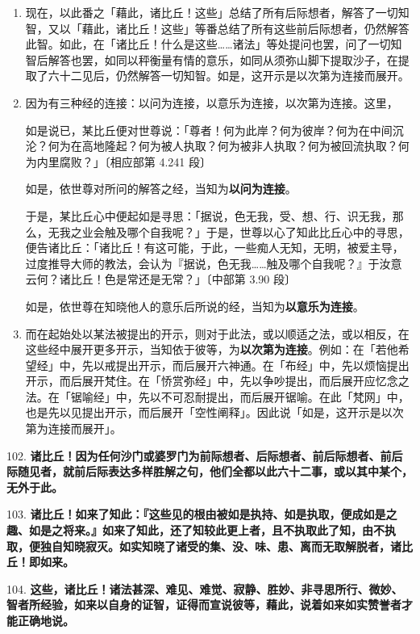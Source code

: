 \begin{enumerate}\item 现在，以此番之「藉此，诸比丘！这些」总结了所有后际想者，解答了一切知智，又以「藉此，诸比丘！这些」等番总结了所有这些前后际想者，仍然解答此智。如此，在「诸比丘！什么是这些……诸法」等处提问也罢，问了一切知智后解答也罢，如同以秤衡量有情的意乐，如同从须弥山脚下提取沙子，在提取了六十二见后，仍然解答一切知智。如是，这开示是以次第为连接而展开。
\item 因为有三种经的连接：以问为连接，以意乐为连接，以次第为连接。这里，\begin{quoting}如是说已，某比丘便对世尊说：「尊者！何为此岸？何为彼岸？何为在中间沉沦？何为在高地隆起？何为被人执取？何为被非人执取？何为被回流执取？何为内里腐败？」{\bluefootnotesize 〔相应部第 4.241 段〕}\end{quoting}如是，依世尊对所问的解答之经，当知为\textbf{以问为连接}。\begin{quoting}于是，某比丘心中便起如是寻思：「据说，色无我，受、想、行、识无我，那么，无我之业会触及哪个自我呢？」于是，世尊以心了知此比丘心中的寻思，便告诸比丘：「诸比丘！有这可能，于此，一些痴人无知，无明，被爱主导，过度推导大师的教法，会认为『据说，色无我……触及哪个自我呢？』于汝意云何？诸比丘！色是常还是无常？」{\bluefootnotesize 〔中部第 3.90 段〕}\end{quoting}如是，依世尊在知晓他人的意乐后所说的经，当知为\textbf{以意乐为连接}。
\item 而在起始处以某法被提出的开示，则对于此法，或以顺适之法，或以相反，在这些经中展开更多开示，当知依于彼等，为\textbf{以次第为连接}。例如：在「若他希望经」中，先以戒提出开示，而后展开六神通。在「布经」中，先以烦恼提出开示，而后展开梵住。在「㤭赏弥经」中，先以争吵提出，而后展开应忆念之法。在「锯喻经」中，先以不可忍耐提出，而后展开锯喻。在此「梵网」中，也是先以见提出开示，而后展开「空性阐释」。因此说「如是，这开示是以次第为连接而展开」。\end{enumerate}

{\Large 102.} \textbf{诸比丘！因为任何沙门或婆罗门为前际想者、后际想者、前后际想者、前后际随见者，就前后际表达多样胜解之句，他们全都以此六十二事，或以其中某个，无外于此。}

{\Large 103.} \textbf{诸比丘！如来了知此：『这些见的根由被如是执持、如是执取，便成如是之趣、如是之将来。』如来了知此，还了知较此更上者，且不执取此了知，由不执取，便独自知晓寂灭。如实知晓了诸受的集、没、味、患、离而无取解脱者，诸比丘！即如来。}

{\Large 104.} \textbf{这些，诸比丘！诸法甚深、难见、难觉、寂静、胜妙、非寻思所行、微妙、智者所经验，如来以自身的证智，证得而宣说彼等，藉此，说着如来如实赞誉者才能正确地说。}

